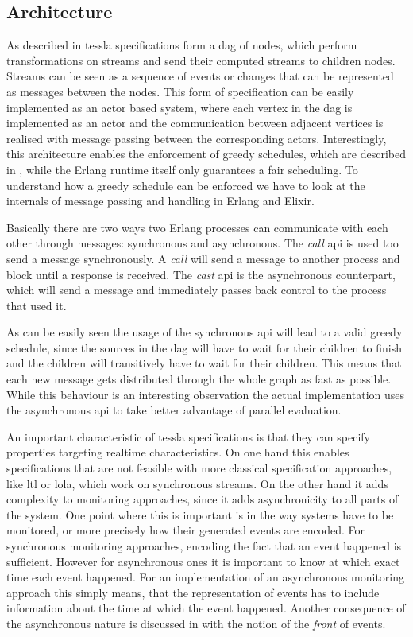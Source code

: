 \subsection{Architecture}
\label{sec:implementation:tesslaserver:architecture}

As described in  \gls{tessla} specifications form a \gls{dag} of nodes, which perform transformations on streams and send their computed streams to children nodes.
Streams can be seen as a sequence of events or changes that can be represented as messages between the nodes.
This form of specification can be easily implemented as an actor based system, where each vertex in the \gls{dag} is implemented as an actor and the communication between adjacent vertices is realised with message passing between the corresponding actors.
Interestingly, this architecture enables the enforcement of greedy schedules, which are described in , while the Erlang runtime itself only guarantees a fair scheduling.
To understand how a greedy schedule can be enforced we have to look at the internals of message passing and handling in Erlang and Elixir.

Basically there are two ways two Erlang processes can communicate with each other through messages: synchronous and asynchronous.
The \emph{call} \gls{api} is used too send a message synchronously.
A \emph{call} will send a message to another process and block until a response is received.
The \emph{cast} \gls{api} is the asynchronous counterpart, which will send a message and immediately passes back control to the process that used it.

As can be easily seen the usage of the synchronous \gls{api} will lead to a valid greedy schedule, since the sources in the \gls{dag} will have to wait for their children to finish and the children will transitively have to wait for their children.
This means that each new message gets distributed through the whole graph as fast as possible.
While this behaviour is an interesting observation the actual implementation uses the asynchronous \gls{api} to take better advantage of parallel evaluation.

An important characteristic of \gls{tessla} specifications is that they can specify properties targeting realtime characteristics.
On one hand this enables specifications that are not feasible with more classical specification approaches, like \gls{ltl} or \gls{lola}, which work on synchronous streams.
On the other hand it adds complexity to monitoring approaches, since it adds asynchronicity to all parts of the system.
One point where this is important is in the way systems have to be monitored, or more precisely how their generated events are encoded.
For synchronous monitoring approaches, encoding the fact that an event happened is sufficient.
However for asynchronous ones it is important to know at which exact time each event happened.
For an implementation of an asynchronous monitoring approach this simply means, that the representation of events has to include information about the time at which the event happened.
Another consequence of the asynchronous nature is discussed in  with the notion of the \emph{front} of events.

